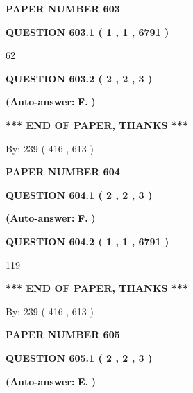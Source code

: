 \documentclass[12pt]{article}
\begin{document}
   
\newpage 
\setcounter{page}{ 
   603001 } 
   
   
 {\textbf{ \Large{ PAPER NUMBER  603  }}}
   
   
   
   
  
  
{\textbf{\large{QUESTION
603.1 
 ( 1 , 1 , 6791 )
}}}

62
  
  
{\textbf{\large{QUESTION
603.2 
 ( 2 , 2 , 3 )
}}}
 
 
{\textbf{(Auto-answer:}}
{\textbf{\large{
F.}}}
{\textbf{)}}
 
 
   
   
   
   
\vspace{1.0in} 
{\textbf{\large{ *** END OF PAPER, THANKS *** }}} 
   
   
\hspace{1.0in} By: 
 239 ( 416 ,  613 )
   
   
   
   
\newpage 
\setcounter{page}{ 
   604001 } 
   
   
 {\textbf{ \Large{ PAPER NUMBER  604  }}}
   
   
   
   
  
  
{\textbf{\large{QUESTION
604.1 
 ( 2 , 2 , 3 )
}}}
 
 
{\textbf{(Auto-answer:}}
{\textbf{\large{
F.}}}
{\textbf{)}}
 
 
  
  
{\textbf{\large{QUESTION
604.2 
 ( 1 , 1 , 6791 )
}}}

119
   
   
   
   
\vspace{1.0in} 
{\textbf{\large{ *** END OF PAPER, THANKS *** }}} 
   
   
\hspace{1.0in} By: 
 239 ( 416 ,  613 )
   
   
   
   
\newpage 
\setcounter{page}{ 
   605001 } 
   
   
 {\textbf{ \Large{ PAPER NUMBER  605  }}}
   
   
   
   
  
  
{\textbf{\large{QUESTION
605.1 
 ( 2 , 2 , 3 )
}}}
 
 
{\textbf{(Auto-answer:}}
{\textbf{\large{
E.}}}
{\textbf{)}}
 
 
  
\end{document}
